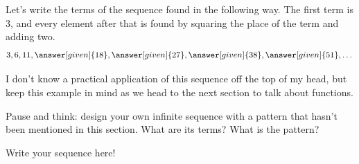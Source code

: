 \documentclass{ximera}
\begin{document}
\begin{example}
Let's write the terms of the sequence found in the following way. The first term is $3$, and every element after that is found by squaring the place of the term and adding two.
\[
3, 6, 11, \answer[given]{18}, \answer[given]{27}, \answer[given]{38}, \answer[given]{51}, \dots
\]


I don't know a practical application of this sequence off the top of my head, but keep this example in mind as we head to the next section to talk about functions.

\end{example}

\begin{question}
Pause and think: design your own infinite sequence with a pattern that hasn't been mentioned in this section. What are its terms? What is the pattern?
\begin{freeResponse}
Write your sequence here!
\end{freeResponse}
\end{question}
\end{document}
